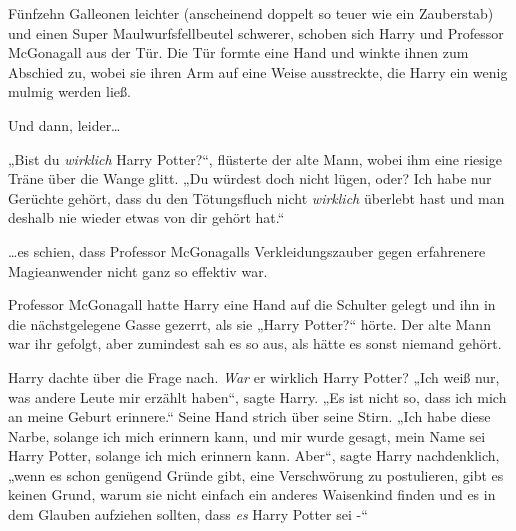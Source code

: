 Fünfzehn Galleonen leichter (anscheinend doppelt so teuer wie ein Zauberstab) und einen Super Maulwurfsfellbeutel  schwerer, schoben sich Harry und Professor McGonagall aus der Tür. Die Tür formte eine Hand und winkte ihnen zum Abschied zu, wobei sie ihren Arm auf eine Weise ausstreckte, die Harry ein wenig mulmig werden ließ.

Und dann, leider…

„Bist du \emph{wirklich} Harry Potter?“, flüsterte der alte Mann, wobei ihm eine riesige Träne über die Wange glitt. „Du würdest doch nicht lügen, oder? Ich habe nur Gerüchte gehört, dass du den Tötungsfluch nicht \emph{wirklich} überlebt hast und man deshalb nie wieder etwas von dir gehört hat.“

…es schien, dass Professor McGonagalls Verkleidungszauber gegen erfahrenere Magieanwender nicht ganz so effektiv war.

Professor McGonagall hatte Harry eine Hand auf die Schulter gelegt und ihn in die nächstgelegene Gasse gezerrt, als sie „Harry Potter?“ hörte. Der alte Mann war ihr gefolgt, aber zumindest sah es so aus, als hätte es sonst niemand gehört.

Harry dachte über die Frage nach. \emph{War} er wirklich Harry Potter? „Ich weiß nur, was andere Leute mir erzählt haben“, sagte Harry. „Es ist nicht so, dass ich mich an meine Geburt erinnere.“ Seine Hand strich über seine Stirn. „Ich habe diese Narbe, solange ich mich erinnern kann, und mir wurde gesagt, mein Name sei Harry Potter, solange ich mich erinnern kann. Aber“, sagte Harry nachdenklich, „wenn es schon genügend Gründe gibt, eine Verschwörung zu postulieren, gibt es keinen Grund, warum sie nicht einfach ein anderes Waisenkind finden und es in dem Glauben aufziehen sollten, dass \emph{es} Harry Potter sei -“

